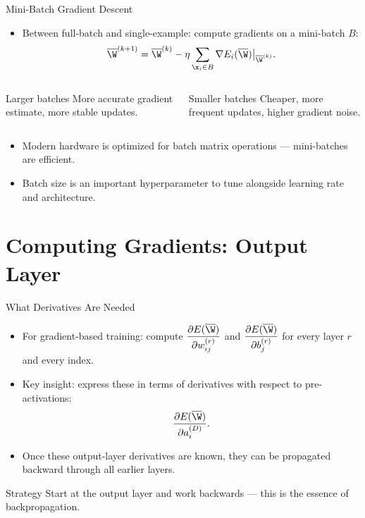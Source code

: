 \begin{frame}{Mini-Batch Gradient Descent}
  \begin{itemize}
    \item Between full-batch and single-example: compute gradients on a \alert{mini-batch} $B$:
    \[
      \overline{\W}^{(k+1)} = \overline{\W}^{(k)} - \eta \sum_{\x_i \in B} \nabla E_i(\overline{\W})\big|_{\overline{\W}^{(k)}}.
    \]
  \end{itemize}
  \begin{columns}[t]
      \begin{block}{Larger batches}
        More accurate gradient estimate, more stable updates.
      \end{block}
      \begin{block}{Smaller batches}
        Cheaper, more frequent updates, higher gradient noise.
      \end{block}
  \end{columns}
  \medskip
  \begin{itemize}
    \item Modern hardware is optimized for \alert{batch matrix operations} — mini-batches are efficient.
    \item Batch size is an important \alert{hyperparameter} to tune alongside learning rate and architecture.
  \end{itemize}
\end{frame}

\section{Computing Gradients: Output Layer}

\begin{frame}{What Derivatives Are Needed}
  \begin{itemize}
    \item For gradient-based training: compute $\dfrac{\partial E(\overline{\W})}{\partial w_{ij}^{(r)}}$ and $\dfrac{\partial E(\overline{\W})}{\partial b_j^{(r)}}$ for every layer $r$ and every index.
    \item Key insight: express these in terms of derivatives with respect to \alert{pre-activations}:
    \[
      \frac{\partial E(\overline{\W})}{\partial a_i^{(D)}}.
    \]
    \item Once these output-layer derivatives are known, they can be \alert{propagated backward} through all earlier layers.
  \end{itemize}
  \begin{block}{Strategy}
    Start at the output layer and work backwards — this is the essence of \alert{backpropagation}.
  \end{block}
\end{frame}

